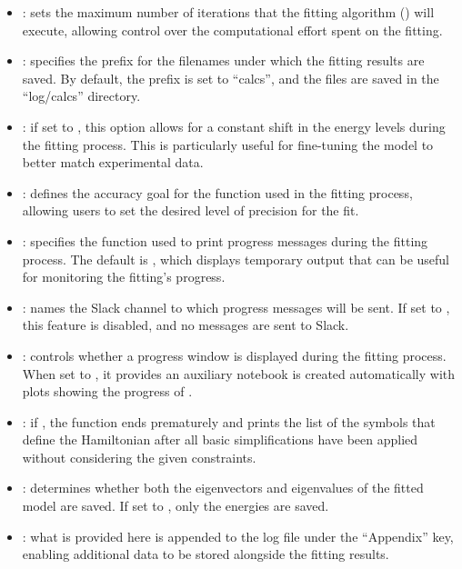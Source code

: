 \documentclass[11pt, twoside,openright]{article}
\begin{document}
\begin{itemize}
	\item {}: sets the maximum number of iterations that the fitting algorithm () will execute, allowing control over the computational effort spent on the fitting.
	
	\item {}: specifies the prefix for the filenames under which the fitting results are saved. By default, the prefix is set to ``calcs'', and the files are saved in the ``log/calcs'' directory.
	
	\item {}: if set to , this option allows for a constant shift in the energy levels during the fitting process. This is particularly useful for fine-tuning the model to better match experimental data.
	
	\item {}: defines the accuracy goal for the  function used in the fitting process, allowing users to set the desired level of precision for the fit.
	
	\item {}: specifies the function used to print progress messages during the fitting process. The default is , which displays temporary output that can be useful for monitoring the fitting's progress.
	
	\item {}: names the Slack channel to which progress messages will be sent. If set to , this feature is disabled, and no messages are sent to Slack.
	
	\item {}: controls whether a progress window is displayed during the fitting process. When set to , it provides an auxiliary notebook is created automatically with plots showing the progress of .
	
	\item {}: if , the function ends prematurely and prints the  list of the symbols that define the Hamiltonian after all basic simplifications have been applied without considering the given constraints.
	
	\item {}: determines whether both the eigenvectors and eigenvalues of the fitted model are saved. If set to , only the energies are saved.
	
	\item {}: what is provided here is appended to the log file under the ``Appendix'' key, enabling additional data to be stored alongside the fitting results.
\end{itemize}
\end{document}

